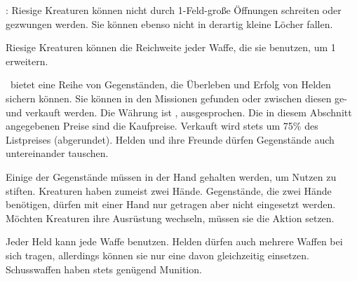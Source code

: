 {		: Riesige Kreaturen können nicht durch 1-Feld-große Öffnungen schreiten oder gezwungen werden. Sie können ebenso nicht in derartig kleine Löcher fallen.

		 Riesige Kreaturen können die Reichweite jeder Waffe, die sie benutzen, um 1 erweitern.

		\bmh~bietet eine Reihe von Gegenständen, die Überleben und Erfolg von Helden sichern können. Sie können in den Missionen gefunden oder zwischen diesen ge- und verkauft werden. Die Währung ist ,  ausgesprochen. Die in diesem Abschnitt angegebenen Preise sind die Kaufpreise. Verkauft wird stets um 75\% des Listpreises (abgerundet). Helden und ihre Freunde dürfen Gegenstände auch untereinander tauschen.

		Einige der Gegenstände müssen in der Hand gehalten werden, um Nutzen zu stiften. Kreaturen haben zumeist zwei Hände. Gegenstände, die zwei Hände benötigen, dürfen mit einer Hand nur getragen aber nicht eingesetzt werden. Möchten Kreaturen ihre Ausrüstung wechseln, müssen sie die Aktion  setzen.

			Jeder Held kann jede Waffe benutzen. Helden dürfen auch mehrere Waffen bei sich tragen, allerdings können sie nur eine davon gleichzeitig einsetzen. Schusswaffen haben stets genügend Munition.


}
